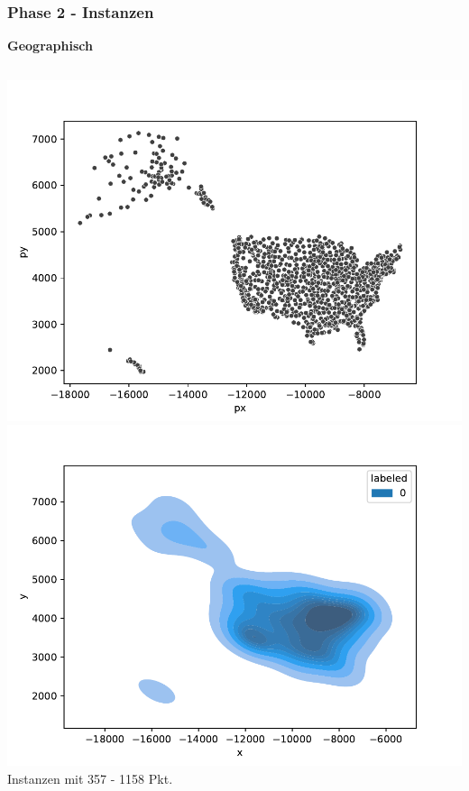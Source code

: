\documentclass[aspectratio=169]{beamer}
\begin{document}


\begin{frame}
	\frametitle{Phase 2 - Instanzen}
	\textbf{Geographisch}
	\begin{columns}[c] %
		
		\includegraphics[scale=.41]{scatter_us_cities.pdf}
		\includegraphics[scale=.41]{density_us_cities.pdf}\\
		 Instanzen mit 357 - 1158 Pkt.
		
	
	\end{columns}
	\end{frame}
	
\end{document}
